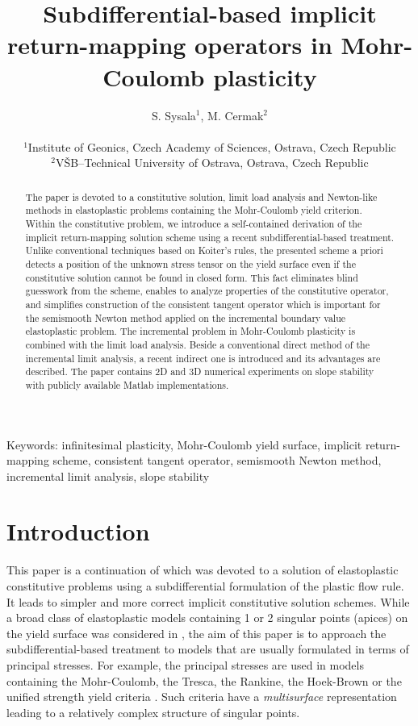 \documentclass[a4paper,12pt]{article}
\title{Subdifferential-based implicit return-mapping operators in Mohr-Coulomb plasticity}
\author{S. Sysala$^1$, M. Cermak$^{2}$ \\ \\ $^1$Institute of Geonics, Czech Academy of Sciences, Ostrava, Czech
Republic\\ $^2$V\v SB--Technical University of Ostrava, Ostrava, Czech Republic}
\theoremstyle{remark}
\numberwithin{equation}{section}
\begin{document}
\maketitle

\begin{abstract}
The paper is devoted to a constitutive solution, limit load analysis and Newton-like methods in elastoplastic problems containing the Mohr-Coulomb yield criterion. Within the constitutive problem, we introduce a self-contained derivation of the implicit return-mapping solution scheme using a recent subdifferential-based treatment. Unlike conventional techniques based on Koiter's rules, the presented scheme a priori detects a position of the unknown stress tensor on the yield surface even if the constitutive solution cannot be found in closed form. This fact eliminates blind guesswork from the scheme, enables to analyze properties of the constitutive operator, and simplifies construction of the consistent tangent operator which is important for the semismooth Newton method applied on the incremental boundary value elastoplastic problem. The incremental problem in Mohr-Coulomb plasticity is combined with the limit load analysis. Beside a conventional direct method of the incremental limit analysis, a recent indirect one is introduced and its advantages are described. The paper contains 2D and 3D numerical experiments on slope stability with publicly available Matlab implementations.

\end{abstract}

\noindent
Keywords: infinitesimal plasticity, Mohr-Coulomb yield surface, implicit return-mapping scheme, consistent tangent operator, semismooth Newton method, incremental limit analysis, slope stability


\section{Introduction}

This paper is a continuation of \cite{SCKKZB15} which was devoted to a solution of elastoplastic constitutive problems using a subdifferential formulation of the plastic flow rule. It leads to simpler and more correct implicit constitutive solution schemes. While a broad class of elastoplastic models containing 1 or 2 singular points (apices) on the yield surface was considered in \cite{SCKKZB15}, the aim of this paper is to approach the subdifferential-based treatment to models that are usually formulated in terms of principal stresses.  For example, the principal stresses are used in models containing the Mohr-Coulomb, the Tresca, the Rankine, the Hoek-Brown or the unified strength yield criteria \cite{NPO08,CDA15,LL15,LR96}. Such criteria have a {\it multisurface} representation leading to a relatively complex structure of singular points. 
\end{document}
